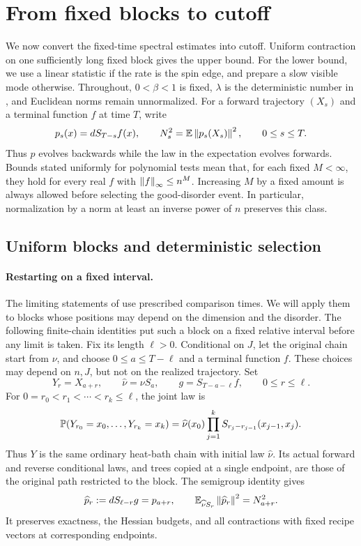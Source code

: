 \section{From fixed blocks to cutoff}
\label{sec:cutoff}

We now convert the fixed-time spectral estimates into cutoff.  Uniform
contraction on one sufficiently long fixed block gives the upper bound.
For the lower bound, we use a linear statistic if the rate is the spin
edge, and prepare a slow visible mode otherwise.  Throughout,
$0<\beta<1$ is fixed, $\lambda$ is the deterministic number in
, and Euclidean norms remain unnormalized.  For a forward trajectory $(X_s)$ and a terminal
function $f$ at time $T$, write
\[
 p_s(x)=dS_{T-s}f(x),\qquad
 N_s^2=\E\norm{p_s(X_s)}^2,\qquad 0\le s\le T.
\]
Thus $p$ evolves backwards while the law in the expectation evolves
forwards.  Bounds stated uniformly for polynomial tests mean that, for
each fixed $M<\infty$, they hold for every real $f$ with
$\norm f_\infty\le n^M$.  Increasing $M$ by a fixed amount is always
allowed before selecting the good-disorder event.  In particular,
normalization by a norm at least an inverse power of $n$ preserves this
class.

\subsection{Uniform blocks and deterministic selection}

\paragraph{Restarting on a fixed interval.}
The limiting statements of  use prescribed comparison
times.  We will apply them to blocks whose positions may depend on the
dimension and the disorder.  The following finite-chain identities put
such a block on a fixed relative interval before any limit is taken.
Fix its length $\ell>0$.  Conditional on $J$, let the original chain
start from $\nu$, and choose $0\le a\le T-\ell$ and a terminal
function $f$.  These choices may depend on $n,J$, but not on the
realized trajectory.  Set
\[
 Y_r=X_{a+r},\qquad \widehat\nu=\nu S_a,\qquad
 g=S_{T-a-\ell}f,\qquad 0\le r\le\ell.
\]
For $0=r_0<r_1<\cdots<r_k\le\ell$, the joint law is
\[
 \P(Y_{r_0}=x_0,\ldots,Y_{r_k}=x_k)
 =\widehat\nu(x_0)\prod_{j=1}^k
      S_{r_j-r_{j-1}}(x_{j-1},x_j).
\]
Thus $Y$ is the same ordinary heat-bath chain with initial law
$\widehat\nu$.  Its actual forward and reverse conditional laws,
and trees copied at a single endpoint, are those of the original
path restricted to the block.  The semigroup identity gives
\begin{equation}\label{eq:cutoff-restart}
 \widehat p_r:=dS_{\ell-r}g=p_{a+r},\qquad
 \E_{\widehat\nu S_r}\norm{\widehat p_r}^2=N_{a+r}^2.
\end{equation}
It preserves exactness, the Hessian budgets, and all contractions with
fixed recipe vectors at corresponding endpoints.

